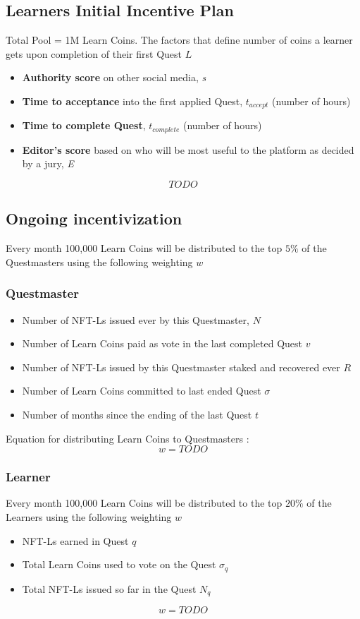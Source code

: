 \documentclass{article}
\begin{document}
    \subsection{Learners Initial Incentive Plan}
      Total Pool = 1M Learn Coins. The factors that define number of coins a learner gets upon completion of their first Quest \(L\)
      \begin{itemize}
        \item \textbf{Authority score} on other social media, \textit{s}
        \item \textbf{Time to acceptance} into the first applied Quest, \(t_{accept}\) (number of hours)
        \item \textbf{Time to complete Quest}, \(t_{complete}\) (number of hours)
        \item \textbf{Editor's score} based on who will be most useful to the platform as decided by a jury, \textit{E}
      \end{itemize}
      \[
        TODO
      \]
    \subsection{Ongoing incentivization}
      Every month 100,000 Learn Coins will be distributed to the top \(5\%\) of the Questmasters using the following weighting \(w\) 
      \subsubsection{Questmaster}
        \begin{itemize}
          \item Number of NFT-Ls issued ever by this Questmaster, \(N\)
          \item Number of Learn Coins paid as vote in the last completed Quest \(v\)
          \item Number of NFT-Ls issued by this Questmaster staked and recovered ever \(R\)
          \item Number of Learn Coins committed to last ended Quest \(\sigma\)
          \item Number of months since the ending of the last Quest \(t\)
        \end{itemize}
        Equation for distributing Learn Coins to Questmasters :
        \[
          w =  TODO
        \]

      \subsubsection{Learner }  
        Every month 100,000 Learn Coins will be distributed to the top \(20\%\) of the Learners using the following weighting \(w\) 
        \begin{itemize}
          \item NFT-Ls earned in Quest \(q\)
          \item Total Learn Coins used to vote on the Quest \(\sigma_q\)
          \item Total NFT-Ls issued so far in the Quest \(N_q\)
        \end{itemize}
        \[
          w = TODO
        \]
\end{document}
